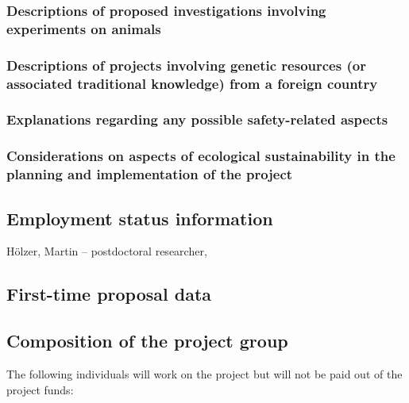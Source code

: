 \documentclass{scrartcl}
\begin{document}
\subsubsection{Descriptions of proposed investigations involving experiments on animals}

\subsubsection{Descriptions of projects involving genetic resources (or associated traditional knowledge) from a foreign country}

\subsubsection{Explanations regarding any possible safety-related aspects}



\subsubsection{Considerations on aspects of ecological sustainability in the planning and implementation of the project}

\subsection{Employment status information}
H\"olzer, Martin -- postdoctoral researcher, 

\subsection{First-time proposal data}

\subsection{Composition of the project group}
The following individuals will work on the project but will not be paid out of
the project funds:
\end{document}

